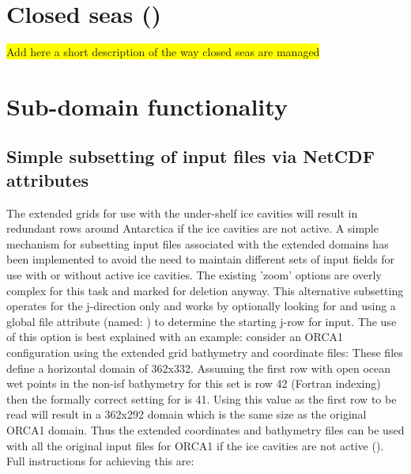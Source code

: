 \documentclass[../main/NEMO_manual]{subfiles}
\begin{document}
\section{Closed seas (\protect{})}
\label{sec:MISC_closea}

\colorbox{yellow}{Add here a short description of the way closed seas are managed}


\section{Sub-domain functionality}
\label{sec:MISC_zoom}

\subsection{Simple subsetting of input files via NetCDF attributes}

The extended grids for use with the under-shelf ice cavities will result in redundant rows around Antarctica if
the ice cavities are not active.
A simple mechanism for subsetting input files associated with the extended domains has been implemented to
avoid the need to maintain different sets of input fields for use with or without active ice cavities.
The existing 'zoom' options are overly complex for this task and marked for deletion anyway.
This alternative subsetting operates for the j-direction only and works by optionally looking for and
using a global file attribute (named: ) to determine the starting j-row for input.
The use of this option is best explained with an example:
consider an ORCA1 configuration using the extended grid bathymetry and coordinate files:
\vspace{-10pt}
\noindent These files define a horizontal domain of 362x332.
Assuming the first row with open ocean wet points in the non-isf bathymetry for this set is row 42
(Fortran indexing) then the formally correct setting for  is 41.
Using this value as the first row to be read will result in a 362x292 domain which is the same size as
the original ORCA1 domain.
Thus the extended coordinates and bathymetry files can be used with all the original input files for ORCA1 if
the ice cavities are not active ().
Full instructions for achieving this are:
\end{document}
